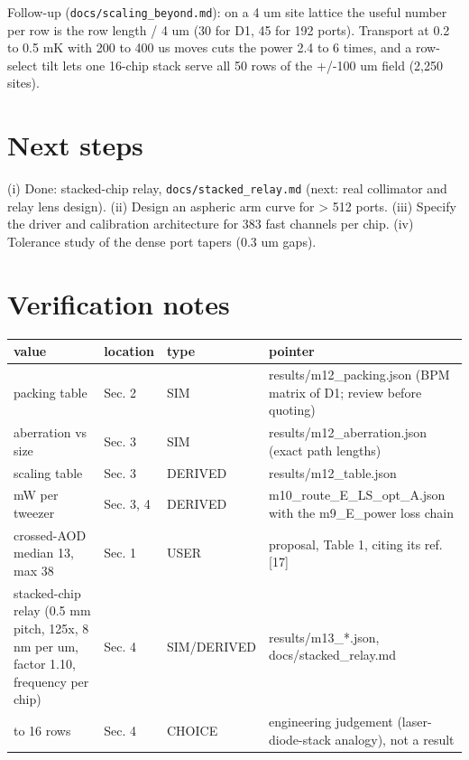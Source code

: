 Follow-up (\texttt{docs/scaling\_beyond.md}): on a 4 um site lattice the
useful number per row is the row length / 4 um (30 for D1, 45 for 192
ports). Transport at 0.2 to 0.5 mK with 200 to 400 us moves cuts the
power 2.4 to 6 times, and a row-select tilt lets one 16-chip stack serve
all 50 rows of the +/-100 um field (2,250 sites).

\hypertarget{5-next-steps}{%
\section{Next steps}\label{scaling-5-next-steps}}

(i) Done: stacked-chip relay, \texttt{docs/stacked\_relay.md} (next:
real collimator and relay lens design). (ii) Design an aspheric arm
curve for \textgreater{} 512 ports. (iii) Specify the driver and
calibration architecture for 383 fast channels per chip. (iv) Tolerance
study of the dense port tapers (0.3 um gaps).

\hypertarget{verification-notes}{%
\section{Verification notes}\label{scaling-verification-notes}}

{\footnotesize
\begin{longtable}[]{@{}>{\raggedright\arraybackslash}p{0.306\dimexpr(\linewidth-8\tabcolsep)\relax}>{\raggedright\arraybackslash}p{0.112\dimexpr(\linewidth-8\tabcolsep)\relax}>{\raggedright\arraybackslash}p{0.153\dimexpr(\linewidth-8\tabcolsep)\relax}>{\raggedright\arraybackslash}p{0.429\dimexpr(\linewidth-8\tabcolsep)\relax}@{}}
\toprule\noalign{}
value & location & type & pointer \\
\midrule\noalign{}
\endhead
\bottomrule\noalign{}
\endlastfoot
packing table & Sec. 2 & SIM & results/m12\_packing.json (BPM matrix of
D1; review before quoting) \\
aberration vs size & Sec. 3 & SIM & results/m12\_aberration.json (exact
path lengths) \\
scaling table & Sec. 3 & DERIVED & results/m12\_table.json \\
43 mW per tweezer & Sec. 3, 4 & DERIVED & m10\_route\_E\_LS\_opt\_A.json
with the m9\_E\_power loss chain \\
crossed-AOD median 13, max 38 & Sec. 1 & USER & proposal, Table 1,
citing its ref. {[}17{]} \\
stacked-chip relay (0.5 mm pitch, 125x, 8 nm per um, factor 1.10,
frequency per chip) & Sec. 4 & SIM/DERIVED & results/m13\_*.json,
docs/stacked\_relay.md \\
8 to 16 rows & Sec. 4 & CHOICE & engineering judgement
(laser-diode-stack analogy), not a result \\
\end{longtable}
}
